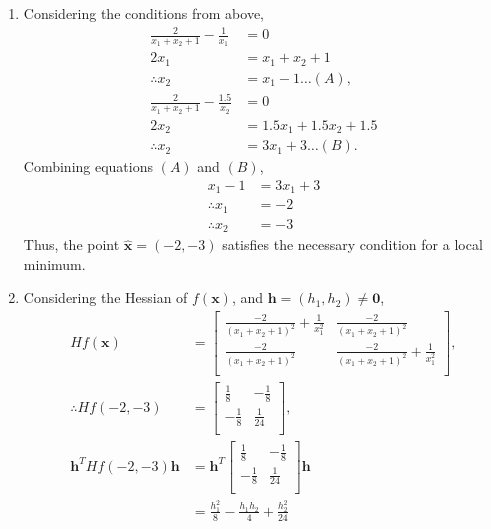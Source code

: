 \documentclass[a4paper,11pt]{article}
\newcommand{\ds}{\displaystyle}
\begin{document}
{{\begin{enumerate}[leftmargin=*]
\begin{enumerate}[label=\alph*)]
			\item Considering the conditions from above, 
				\begin{align*}
					\frac{2}{x_1+x_2+1} - \frac{1}{x_1} & = 0 \\
					2x_1 & = x_1 + x_2 + 1 \\
					\therefore x_2 & = x_1 - 1 \dots (A),\\
					\frac{2}{x_1+x_2+1}-\frac{1.5}{x_2} & = 0 \\
					2x_2 & = 1.5x_1 + 1.5x_2 + 1.5 \\
					\therefore x_2 & = 3x_1 + 3 \dots(B).
				\end{align*}
				Combining equations $\ds{(A)}$ and $\ds{(B)}$, 
				\begin{align*}
					x_1 - 1 & = 3x_1 + 3 \\
					\therefore x_1 & = -2 \\
					\therefore x_2 & = -3
				\end{align*}
				Thus, the point $\ds{\hat{\mathbf{x}} = (-2,-3)}$ satisfies the necessary condition for a local minimum.
			\item Considering the Hessian of $\ds{f(\mathbf{x})}$, and $\ds{\mathbf{h} = (h_1,h_2) \neq \mathbf{0}}$,
				\begin{align*}
					Hf(\mathbf{x}) & =
					\begin{bmatrix}
						\frac{-2}{(x_1+x_2+1)^2} + \frac{1}{x_1^2} & \frac{-2}{(x_1+x_2+1)^2} \\
						\frac{-2}{(x_1+x_2+1)^2} & \frac{-2}{(x_1+x_2+1)^2} + \frac{1}{x_1^2} \\
					\end{bmatrix}, \\
					\therefore Hf(-2,-3) & = 
					\begin{bmatrix}
						\frac{1}{8} & -\frac{1}{8} \\
						-\frac{1}{8} & \frac{1}{24} \\
					\end{bmatrix}, \\
					\mathbf{h}^T Hf(-2,-3)\mathbf{h} & = \mathbf{h}^T
					\begin{bmatrix}
						\frac{1}{8} & -\frac{1}{8} \\
						-\frac{1}{8} & \frac{1}{24} \\
					\end{bmatrix}\mathbf{h} \\
					& =\frac{h_1^2}{8} - \frac{h_1h_2}{4} + \frac{h_2^2}{24} \\
				\end{align*}

\end{enumerate}
\end{enumerate}}}
\end{document}
